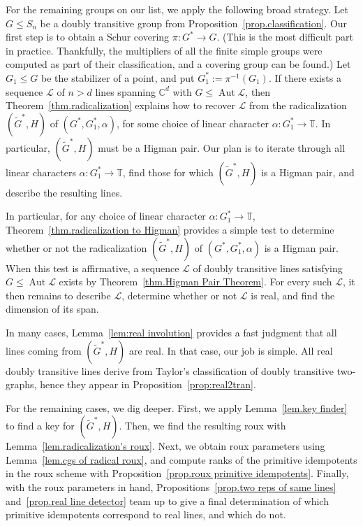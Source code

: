 \documentclass[11pt]{article}
\theoremstyle{definition}
\numberwithin{equation}{section}
\begin{document}
For the remaining groups on our list, we apply the following broad strategy.
Let $G \leq S_n$ be a doubly transitive group from Proposition~\ref{prop.classification}.
Our first step is to obtain a Schur covering $\pi \colon G^* \to G$.
(This is the most difficult part in practice.
Thankfully, the multipliers of all the finite simple groups were computed as part of their classification, and a covering group can be found.)
Let $G_1 \leq G$ be the stabilizer of a point, and put $G_1^* := \pi^{-1}(G_1)$.
If there exists a sequence $\mathscr{L}$ of $n > d$ lines spanning $\mathbb{C}^d$ with $G \leq \operatorname{Aut}\mathscr{L}$, then Theorem~\ref{thm.radicalization} explains how to recover $\mathscr{L}$ from the radicalization~$(\widetilde{G}^*,H)$ of $(G^*,G_1^*,\alpha)$, for some choice of linear character $\alpha \colon G_1^* \to \mathbb{T}$.
In particular, $(\widetilde{G}^*,H)$ must be a Higman pair.
Our plan is to iterate through all linear characters $\alpha \colon G_1^* \to \mathbb{T}$, find those for which $(\widetilde{G}^*,H)$ is a Higman pair, and describe the resulting lines.

In particular, for any choice of linear character $\alpha \colon G_1^* \to \mathbb{T}$, Theorem~\ref{thm.radicalization to Higman} provides a simple test to determine whether or not the radicalization $(\widetilde{G}^*,H)$ of $(G^*,G_1^*,\alpha)$ is a Higman pair.
When this test is affirmative, a sequence $\mathscr{L}$ of doubly transitive lines satisfying $G \leq \operatorname{Aut} \mathscr{L}$ exists by Theorem~\ref{thm.Higman Pair Theorem}.
For every such $\mathscr{L}$, it then remains to describe $\mathscr{L}$, determine whether or not $\mathscr{L}$ is real, and find the dimension of its span.

In many cases, Lemma~\ref{lem:real involution} provides a fast judgment that all lines coming from $(\widetilde{G}^*,H)$ are real.
In that case, our job is simple.
All real doubly transitive lines derive from Taylor's classification of doubly transitive two-graphs, hence they appear in Proposition~\ref{prop:real2tran}.

For the remaining cases, we dig deeper.
First, we apply Lemma~\ref{lem.key finder} to find a key for $(\widetilde{G}^*,H)$.
Then, we find the resulting roux with Lemma~\ref{lem.radicalization's roux}.
Next, we obtain roux parameters using Lemma~\ref{lem.cgs of radical roux}, and compute ranks of the primitive idempotents in the roux scheme with Proposition~\ref{prop.roux primitive idempotents}.
Finally, with the roux parameters in hand, Propositions~\ref{prop.two reps of same lines} and~\ref{prop.real line detector} team up to give a final determination of which primitive idempotents correspond to real lines, and which do not.
\end{document}
